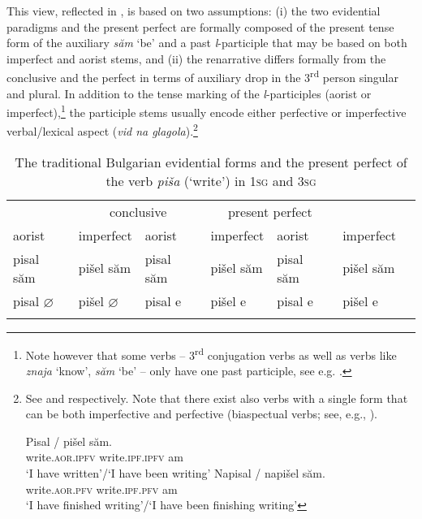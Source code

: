 \documentclass[output=paper]{langscibook}
\begin{document}
\noindent This view, reflected in , is based on two assumptions: (i) the two evidential paradigms and the present perfect are formally composed of the present tense form of the auxiliary \textit{săm} `be' and a past \textit{l}-participle that may be based on both imperfect and aorist stems, and (ii) the renarrative differs formally from the conclusive and the perfect in terms of auxiliary drop in the 3\textsuperscript{rd} person singular and plural.
In addition to the tense marking of the \textit{l}-participles (aorist or imperfect),\footnote{Note however that some verbs -- 3\textsuperscript{rd} conjugation verbs as well as verbs like \textit{znaja} `know',
 \textit{săm} `be' -- only have one past participle, see e.g. \citet{Nicolova2017}.}
the participle stems usually encode either perfective or imperfective verbal/lexical aspect (\textit{vid na glagola}).\footnote{See  and  respectively. Note that there exist also verbs with a single form that can be both imperfective and perfective (biaspectual verbs; see, e.g., \citealt{MacDonald.Markova2010,Rivero.Slavkov2014}).

\ea\label{ex:aorist-imperf-imperf}
\gll Pisal / pišel săm.\\
write.\textsc{aor.ipfv} {} write.\textsc{ipf.ipfv} am \\
\glt `I have written'\slash`I have been writing'
\ex \label{ex:aorist-imperf-perf}
\gll Napisal / napišel săm. \\
write.\textsc{aor.pfv} {} write.\textsc{ipf.pfv} am \\
\glt `I have finished writing'\slash`I have been finishing writing'
\z}

\begin{table}[h]
\centering
 \begin{tabular}{lllllll}
 \lsptoprule
 \multicolumn{2}{c}{renarrative} & \multicolumn{2}{c}{conclusive} & \multicolumn{2}{c}{present perfect}\\\cmidrule(lr){1-2}\cmidrule(lr){3-4}\cmidrule(lr){5-6}
aorist	    & imperfect	   & aorist  & imperfect & aorist & imperfect\\
 \midrule
pisal săm    & pišel săm	    & pisal săm  & pišel săm & pisal săm & pišel săm\\
pisal $\varnothing$	 & pišel $\varnothing$	 & pisal e	 & pišel e & pisal e & pišel e\\
 \lspbottomrule
 \end{tabular}
 \caption{The traditional Bulgarian evidential forms and the present perfect of the verb \textit{piša} (`write') in \textsc{1sg} and \textsc{3sg}\label{tab:traditional}}
\end{table}
\end{document}
